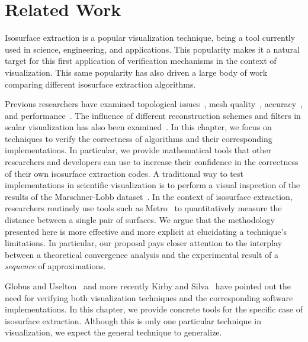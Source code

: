 \section{Related Work}
\label{chap1:sec:prevwork}

Isosurface extraction is a popular visualization technique, being a
tool currently used in science, engineering, and applications.
This popularity makes it a natural target for this first application of
verification mechanisms in the context of visualization.
%
This same popularity has also driven a large body of work
comparing different isosurface extraction algorithms.

Previous researchers have examined topological 
issues~\cite{ning93, Lewiner:2003},
mesh quality~\cite{Dietrich:TVCG:2008,Schreiner06},
accuracy~\cite{patera04,zhou01}, and
performance~\cite{Sutton00acase}. The influence of different reconstruction schemes and 
filters in scalar visualization has also been examined~\cite{Hamish06,Pommert02}.
In this chapter, we focus on techniques to verify the correctness of
algorithms and their corresponding implementations. In particular, we
provide mathematical tools that other researchers and developers can
use to increase their confidence in the correctness of their own
isosurface extraction codes.  A traditional way to test
implementations in scientific visualization is to perform a visual
inspection of the results of the Marschner-Lobb
dataset~\cite{marschnerlobb}. In the context of isosurface extraction,
researchers routinely use tools such as Metro~\cite{Cignoni:1998:MET} to
quantitatively measure the distance between a single pair of surfaces.
We argue that the methodology presented here is more effective and more
explicit at elucidating a technique's limitations. In particular, our proposal
pays closer attention to the interplay between a theoretical
convergence analysis and the experimental result of a \emph{sequence} of
approximations.

Globus and Uselton~\cite{globus95} and more recently
Kirby and Silva~\cite{kirby-vv-08} have pointed out the need 
for verifying both visualization techniques and the corresponding
software implementations. In this chapter, we provide concrete tools for
the specific case of isosurface extraction. Although this is only one
particular technique in visualization, we expect the general technique
to generalize.


